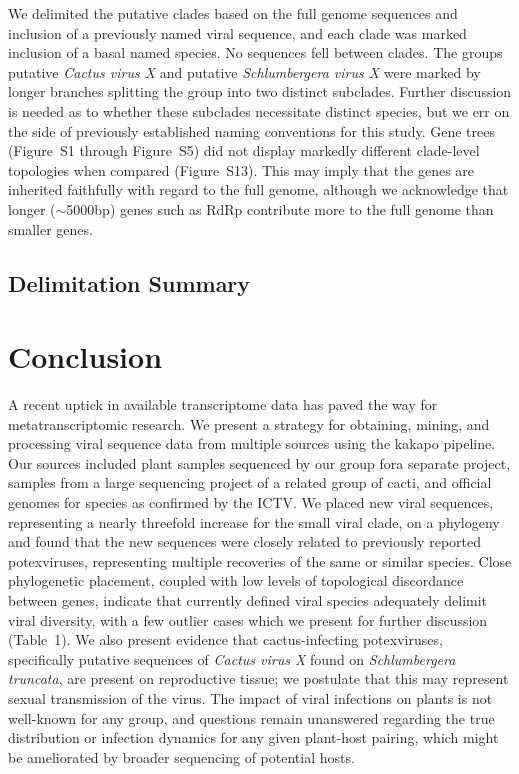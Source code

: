 \documentclass[fleqn,10pt,lineno]{wlpeerj}
\begin{document}
{We delimited the putative clades based on the full genome sequences and inclusion of a previously named viral sequence, and each clade was marked inclusion of a basal named species.
No sequences fell between clades.
The groups putative \textit{Cactus virus X} and putative \textit{Schlumbergera virus X} were marked by longer branches splitting the group into two distinct subclades. 
Further discussion is needed as to whether these subclades necessitate distinct species, but we err on the side of previously established naming conventions for this study.
Gene trees ({Figure~S1} through {Figure~S5}) did not display markedly different clade-level topologies when compared ({Figure~S13}). 
This may imply that the genes are inherited faithfully with regard to the full genome, although we acknowledge that longer ($\sim$5000bp) genes such as RdRp contribute more to the full genome than smaller genes.

\subsection*{Delimitation Summary}

\section*{Conclusion}
A recent uptick in available transcriptome data has paved the way for metatranscriptomic research.
We present a strategy for obtaining, mining, and processing viral sequence data from multiple sources using the kakapo pipeline.
Our sources included plant samples sequenced by our group fora separate project, samples from a large sequencing project of a related group of cacti, and official genomes for species as confirmed by the ICTV.
We placed new viral sequences, representing a nearly threefold increase for the small viral clade, on a phylogeny and found that the new sequences were closely related to previously reported potexviruses, representing multiple recoveries of the same or similar species.
Close phylogenetic placement, coupled with low levels of topological discordance between genes, indicate that currently defined viral species adequately delimit viral diversity, with a few outlier cases which we present for further discussion ({Table~1}).
We also present evidence that cactus-infecting potexviruses, specifically putative sequences of \textit{Cactus virus X} found on \textit{Schlumbergera truncata}, are present on reproductive tissue; we postulate that this may represent sexual transmission of the virus.
The impact of viral infections on plants is not well-known for any group, and questions remain unanswered regarding the true distribution or infection dynamics for any given plant-host pairing, which might be ameliorated by broader sequencing of potential hosts. 


}
\end{document}
